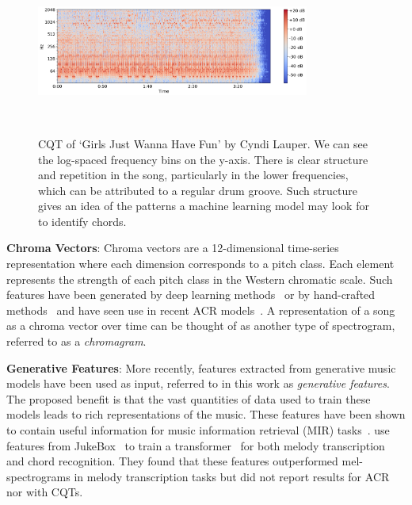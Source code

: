 

\begin{figure}[h]
    \centering
    \includegraphics[width=0.8\textwidth]{figures/sample_cqt.png}
    \caption{CQT of `Girls Just Wanna Have Fun' by Cyndi Lauper. We can see the log-spaced frequency bins on the y-axis. There is clear structure and repetition in the song, particularly in the lower frequencies, which can be attributed to a regular drum groove. Such structure gives an idea of the patterns a machine learning model may look for to identify chords.}~\label{fig:cqt_example}
\end{figure}

\textbf{Chroma Vectors}: Chroma vectors are a 12-dimensional time-series representation where each dimension corresponds to a pitch class. Each element represents the strength of each pitch class in the Western chromatic scale. Such features have been generated by deep learning methods~\citep{BalanceRandomForestACR} or by hand-crafted methods~\citep{NNLSChroma,librosa} and have seen use in recent ACR models~\citep{HarmonyTransformer}. A representation of a song as a chroma vector over time can be thought of as another type of spectrogram, referred to as a \emph{chromagram}.

\textbf{Generative Features}: More recently, features extracted from generative music models have been used as input, referred to in this work as \emph{generative features}. The proposed benefit is that the vast quantities of data used to train these models leads to rich representations of the music. These features have been shown to contain useful information for music information retrieval (MIR) tasks~\citep{GenerativeFeaturesforMIR}. \citet{MelodyTranscriptionViaGenerativePreTraining} use features from JukeBox~\citep{Jukebox} to train a transformer~\citep{AttentionIsAllYouNeed} for both melody transcription and chord recognition. They found that these features outperformed mel-spectrograms in melody transcription tasks but did not report results for ACR nor with CQTs.


